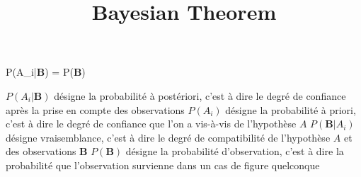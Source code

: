 \documentclass[a4paper,12pt]{article}
\title{Bayesian Theorem}
\begin{document}
\begin{landscape}
\begin{myequation}%
P(A_i|\textbf{B}) =  {P(\textbf{B})}%
\end{myequation}
%
\newline
$P(A_i|\textbf{B})$ désigne la probabilité à postériori, c'est à dire le degré de confiance après la prise en compte des observations
\newline
$P(A_i)$ désigne la probabilité à priori, c'est à dire le degré de confiance que l'on a vis-à-vis de l'hypothèse $A$
\newline
$P(\textbf{B}|A_i)$ désigne vraisemblance, c'est à dire le degré de compatibilité de l'hypothèse $A$ et des observations $\textbf{B}$
\newline
$P(\textbf{B})$ désigne la probabilité d'observation, c'est à dire la probabilité que l'observation survienne dans un cas de figure quelconque
\end{landscape}
\end{document}
